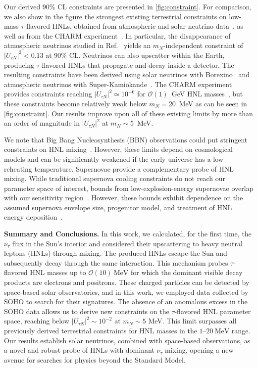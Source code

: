 \documentclass[aps,prd,twocolumn,preprintnumbers,superscriptaddress,nofootinbib]{revtex4-1}
\begin{document}
Our derived 90\% CL constraints are presented in \cref{fig:constraint}. For comparison, we also show in the figure the strongest existing terrestrial constraints on low-mass $\tau$-flavored HNLs, obtained from atmospheric and solar neutrino data~\cite{Dentler:2018sju, Plestid:2020ssy, Gustafson:2022rsz}, as well as from the CHARM experiment~\cite{Orloff:2002de}. 
In particular, the disappearance of atmospheric neutrinos studied in Ref.~\cite{Dentler:2018sju} yields an $m_N$-independent constraint of $|U_{\tau N}|^2 < 0.13$ at 90\% CL. Neutrinos can also upscatter within the Earth, producing $\tau$-flavored HNLs that propagate and decay inside a detector. The resulting constraints have been derived using solar neutrinos with Borexino~\cite{Plestid:2020ssy} and atmospheric neutrinos with Super-Kamiokande~\cite{Gustafson:2022rsz}. The CHARM experiment provides constraints reaching $|U_{\tau N}|^2\simeq 10^{-6}$ for $\mathcal{O}(1)$~GeV HNL masses~\cite{Boiarska:2021yho}, but these constraints become relatively weak below $m_N=20$~MeV as can be seen in \cref{fig:constraint}. Our results improve upon all of these existing limits by more than an order of magnitude in $|U_{\tau N}|^2$ at $m_N\sim 5$~MeV.

We note that Big Bang Nucleosynthesis (BBN) observations could put stringent constraints on HNL mixing~\cite{Ruchayskiy:2012si, Sabti:2020yrt, Boyarsky:2020dzc,Chen:2024cla,Dev:2025pru}. However, these limits depend on cosmological models and can be significantly weakened if the early universe has a low reheating temperature.  
Supernovae provide a complementary probe of HNL mixing. While traditional supernova cooling constraints do not reach our parameter space of interest, bounds from low-explosion-energy supernovae overlap with our sensitivity region~\cite{Carenza:2023old}. However, these bounds exhibit dependence on the assumed supernova envelope size, progenitor model, and treatment of HNL energy deposition~\cite{Chauhan:2023sci}.

\textbf{Summary and Conclusions.}
\noindent
In this work, we calculated, for the first time, the $\nu_\tau$ flux in the Sun's interior and considered their upscattering to heavy neutral leptons (HNLs) through mixing. The produced HNLs escape the Sun and subsequently decay through the same interaction. This mechanism probes $\tau$-flavored HNL masses up to $\mathcal{O}(10)~\mathrm{MeV}$ for which the dominant visible decay products are electrons and positrons. These charged particles can be detected by space-based solar observatories, and in this work, we employed data collected by SOHO to search for their signatures. The absence of an anomalous excess in the SOHO data allows us to derive new constraints on the $\tau$-flavored HNL parameter space, reaching below $|U_{\tau N}|^2\sim 10^{-2}$ at $m_N\sim 5$ MeV. This limit surpasses all previously derived terrestrial constraints for HNL masses in the $1$--$20~\mathrm{MeV}$ range. Our results establish solar neutrinos, combined with space-based observations, as a novel and robust probe of HNLs with dominant $\nu_\tau$ mixing, opening a new avenue for searches for physics beyond the Standard Model.
\end{document}
